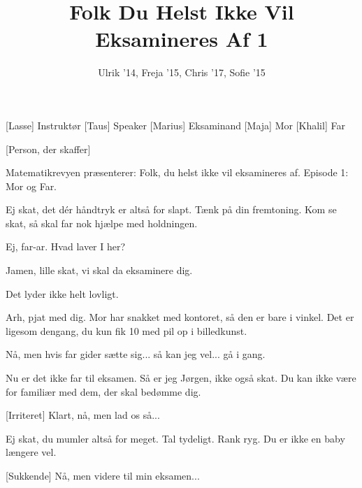 \documentclass[a4paper,11pt]{article}
\title{Folk Du Helst Ikke Vil Eksamineres Af 1}
\author{Ulrik '14, Freja '15, Chris '17, Sofie '15}
\begin{document}
\maketitle

\begin{roles}
[Lasse] Instruktør
[Taus] Speaker
[Marius] Eksaminand
[Maja] Mor
[Khalil] Far
\end{roles}

\begin{props}
[Person, der skaffer]
\end{props}

\begin{sketch}
 Matematikrevyen præsenterer: Folk, du helst ikke vil eksamineres af. Episode 1: Mor og Far.



 Ej skat, det dér håndtryk er altså for slapt. Tænk på din fremtoning. Kom se skat, så skal far nok hjælpe med holdningen.


 Ej, far-ar. Hvad laver I her?

 Jamen, lille skat, vi skal da eksaminere dig.

 Det lyder ikke helt lovligt.

 Arh, pjat med dig. Mor har snakket med kontoret, så den er bare i vinkel. Det er ligesom dengang, du kun fik 10 med pil op i billedkunst.

 Nå, men hvis far gider sætte sig... så kan jeg vel... gå i gang.

 Nu er det ikke far til eksamen. Så er jeg Jørgen, ikke også skat. Du kan ikke være for familiær med dem, der skal bedømme dig.

[Irriteret] Klart, nå, men lad os så...

 Ej skat, du mumler altså for meget. Tal tydeligt. Rank ryg. Du er ikke en baby længere vel.


[Sukkende] Nå, men videre til min eksamen...



\end{sketch}
\end{document}
